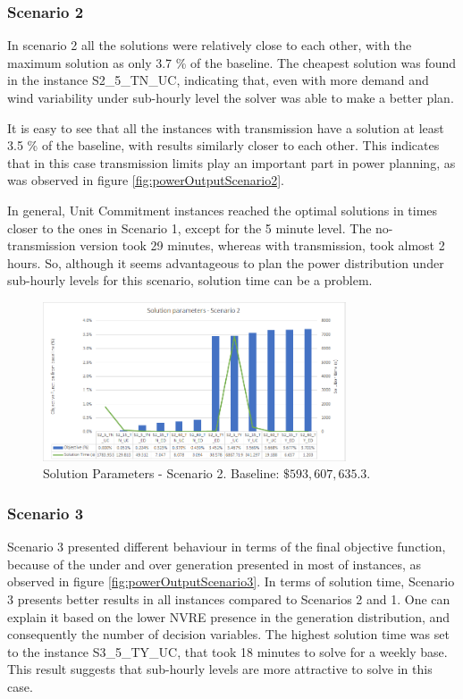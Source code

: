 \documentclass[12pt,LUDisStyle,twosided]{book}
\begin{document}
\subsubsection{Scenario 2}

In scenario 2 all the solutions were relatively close to each other, with the maximum solution as only 3.7 \% of the baseline. The cheapest solution was found in the instance S2\_5\_TN\_UC, indicating that, even with more demand and wind variability under sub-hourly level the solver was able to make a better plan.

It is easy to see that all the instances with transmission have a solution at least 3.5 \% of the baseline, with results similarly closer to each other. This indicates that in this case transmission limits play an important part in power planning, as was observed in figure \ref{fig:powerOutputScenario2}.

In general, Unit Commitment instances reached the optimal solutions in times closer to the ones in Scenario 1, except for the 5 minute level. The no-transmission version took 29 minutes, whereas with transmission, took almost 2 hours. So, although it seems advantageous to plan the power distribution under sub-hourly levels for this scenario, solution time can be a problem.

\begin{figure}[H] 
  \centering  
	  \includegraphics[width=0.8\textwidth,height=\textheight,keepaspectratio]{SolutionParametersS2.png}  
  \caption{Solution Parameters - Scenario 2. Baseline: $\$593,607,635.3$.}
  \label{fig:solutionparameterss2}
\end{figure}

\subsubsection{Scenario 3}

Scenario 3 presented different behaviour in terms of the final objective function, because of the under and over generation presented in most of instances, as observed in figure \ref{fig:powerOutputScenario3}. In terms of solution time, Scenario 3 presents better results in all instances compared to Scenarios 2 and 1. One can explain it based on the lower NVRE presence in the generation distribution, and consequently the number of decision variables. The highest solution time was set to the instance S3\_5\_TY\_UC, that took 18 minutes to solve for a weekly base. This result suggests that sub-hourly levels are more attractive to solve in this case.
\end{document}
